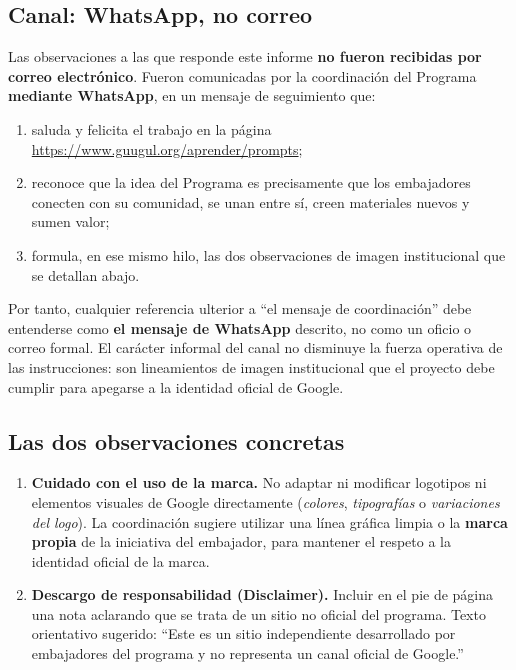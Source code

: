 \documentclass[11pt,a4paper]{article}
\begin{document}
\subsection{Canal: WhatsApp, no correo}

Las observaciones a las que responde este informe \textbf{no fueron recibidas por correo electrónico}. Fueron comunicadas por la coordinación del Programa \textbf{mediante WhatsApp}, en un mensaje de seguimiento que:

\begin{enumerate}[leftmargin=*]
  \item saluda y felicita el trabajo en la página \url{https://www.guugul.org/aprender/prompts};
  \item reconoce que la idea del Programa es precisamente que los embajadores conecten con su comunidad, se unan entre sí, creen materiales nuevos y sumen valor;
  \item formula, en ese mismo hilo, las dos observaciones de imagen institucional que se detallan abajo.
\end{enumerate}

Por tanto, cualquier referencia ulterior a \enquote{el mensaje de coordinación} debe entenderse como \textbf{el mensaje de WhatsApp} descrito, no como un oficio o correo formal. El carácter informal del canal no disminuye la fuerza operativa de las instrucciones: son lineamientos de imagen institucional que el proyecto debe cumplir para apegarse a la identidad oficial de Google.

\subsection{Las dos observaciones concretas}

\begin{enumerate}[leftmargin=*]
  \item \textbf{Cuidado con el uso de la marca.} No adaptar ni modificar logotipos ni elementos visuales de Google directamente (\emph{colores}, \emph{tipografías} o \emph{variaciones del logo}). La coordinación sugiere utilizar una línea gráfica limpia o la \textbf{marca propia} de la iniciativa del embajador, para mantener el respeto a la identidad oficial de la marca.
  \item \textbf{Descargo de responsabilidad (Disclaimer).} Incluir en el pie de página una nota aclarando que se trata de un sitio no oficial del programa. Texto orientativo sugerido: \enquote{Este es un sitio independiente desarrollado por embajadores del programa y no representa un canal oficial de Google.}
\end{enumerate}
\end{document}
